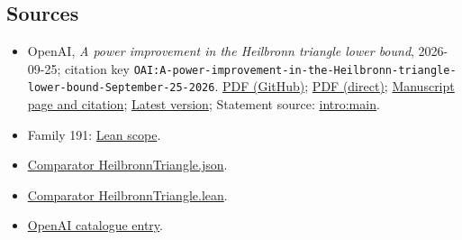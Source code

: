 \documentclass[11pt]{article}
\begin{document}
\subsection{Sources}
\begin{itemize}
\item OpenAI, \emph{A power improvement in the Heilbronn triangle lower bound}, 2026-09-25; citation key \texttt{OAI:A-power-improvement-in-the-Heilbronn-triangle-lower-bound-September-25-2026}. \href{https://github.com/openai/math/blob/adc7f1241b42e322a6451854ab7e4b4c146bf78a/preprints/A-power-improvement-in-the-Heilbronn-triangle-lower-bound-September-25-2026/main.pdf}{PDF (GitHub)}; \href{https://github.com/openai/math/raw/adc7f1241b42e322a6451854ab7e4b4c146bf78a/preprints/A-power-improvement-in-the-Heilbronn-triangle-lower-bound-September-25-2026/main.pdf}{PDF (direct)}; \href{https://github.com/openai/math/blob/adc7f1241b42e322a6451854ab7e4b4c146bf78a/preprints/A-power-improvement-in-the-Heilbronn-triangle-lower-bound-September-25-2026/README.md}{Manuscript page and citation}; \href{https://github.com/openai/math/blob/main/preprints/A-power-improvement-in-the-Heilbronn-triangle-lower-bound-September-25-2026/main.pdf}{Latest version}; Statement source: \href{https://github.com/openai/math/blob/adc7f1241b42e322a6451854ab7e4b4c146bf78a/preprints/A-power-improvement-in-the-Heilbronn-triangle-lower-bound-September-25-2026/build/sections/01-introduction.tex\#L42}{intro:main}.
\item Family 191: \href{https://github.com/openai/math/blob/adc7f1241b42e322a6451854ab7e4b4c146bf78a/lean/docs/191.md}{Lean scope}.
\item \href{https://github.com/openai/math/blob/adc7f1241b42e322a6451854ab7e4b4c146bf78a/lean/ComparatorChallenges/HeilbronnTriangle.json}{Comparator HeilbronnTriangle.json}.
\item \href{https://github.com/openai/math/blob/adc7f1241b42e322a6451854ab7e4b4c146bf78a/lean/ComparatorChallenges/HeilbronnTriangle.lean}{Comparator HeilbronnTriangle.lean}.
\item \href{https://github.com/openai/math/blob/adc7f1241b42e322a6451854ab7e4b4c146bf78a/CONTENTS.md}{OpenAI catalogue entry}.
\end{itemize}
\end{document}
